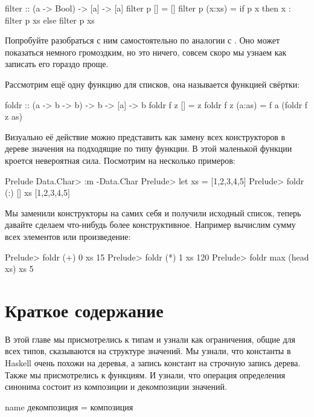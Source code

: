 \begin{code}
filter :: (a -> Bool) -> [a] -> [a]
filter p []     = []
filter p (x:xs) = if p x then x : filter p xs else filter p xs
\end{code}

Попробуйте разобраться с ним самостоятельно по аналогии
с . Оно может показаться немного громоздким,
но это ничего, совсем скоро мы узнаем как записать
его гораздо проще. 

Рассмотрим ещё одну функцию для списков, она называется функцией свёртки:

\begin{code}
foldr :: (a -> b -> b) -> b -> [a] -> b
foldr f z []     = z
foldr f z (a:as) = f a (foldr f z as)
\end{code}

Визуально её действие можно представить как замену 
всех конструкторов в дереве значения на подходящие
по типу функции. В этой маленькой функции кроется 
невероятная сила. Посмотрим на несколько примеров:

\begin{code}
Prelude Data.Char> :m -Data.Char
Prelude> let xs = [1,2,3,4,5]
Prelude> foldr (:) [] xs
[1,2,3,4,5]
\end{code}

Мы заменили конструкторы на самих себя и получили 
исходный список, теперь давайте сделаем что-нибудь
более конструктивное. Например вычислим сумму
всех элементов или произведение:

\begin{code}
Prelude> foldr (+) 0 xs
15
Prelude> foldr (*) 1 xs
120
Prelude> foldr max (head xs) xs
5
\end{code}

\section{Краткое содержание}

В этой главе мы присмотрелись к типам и узнали
как ограничения, общие для всех типов, сказываются на 
структуре значений. Мы узнали, что константы в Haskell 
очень похожи на деревья, а запись 
констант на строчную запись дерева. Также мы присмотрелись
к функциям. И узнали, что операция определения синонима 
состоит из композиции и декомпозиции значений.

\begin{code}
name   декомпозиция   =   композиция
\end{code}


